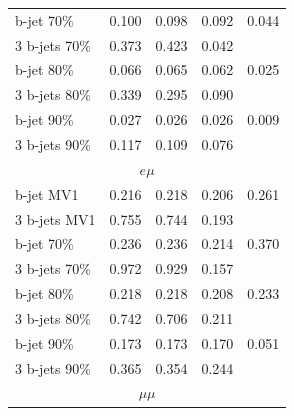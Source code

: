 \begin{table}[h]
\begin{center}
{\begin{tabular}{l|cccc }
            b-jet  70\%   & 0.100 & 0.098 & 0.092 & 0.044 \\        
            3 b-jets 70\% & 0.373 & 0.423 & 0.042 &       \\\hline  
                                                                    
            b-jet 80\%    & 0.066 & 0.065 & 0.062 & 0.025 \\        
            3 b-jets 80\% & 0.339 & 0.295 & 0.090 &       \\\hline  
                                                                    
            b-jet 90\%    & 0.027 & 0.026 & 0.026 & 0.009 \\        
            3 b-jets 90\% & 0.117 & 0.109 & 0.076 &       \\\hline  
                                                                    
            \multicolumn{5}{c}{$e\mu$} \\ \hline 

            b-jet MV1     & 0.216 & 0.218 & 0.206 & 0.261 \\        
            3 b-jets MV1  & 0.755 & 0.744 & 0.193 &       \\\hline  
                                                                    
            b-jet  70\%   & 0.236 & 0.236 & 0.214 &  0.370 \\        
            3 b-jets 70\% & 0.972 & 0.929 & 0.157 &       \\\hline  
                                                                    
            b-jet 80\%    & 0.218 & 0.218 & 0.208 & 0.233 \\        
            3 b-jets 80\% & 0.742 & 0.706 & 0.211 &       \\\hline  
                                                                    
            b-jet 90\%    & 0.173 & 0.173 & 0.170 & 0.051 \\        
            3 b-jets 90\% & 0.365 & 0.354 & 0.244 &       \\\hline  
                                                                    
            \multicolumn{5}{c}{$\mu\mu$} \\ \hline                                                       
                                                                    

\end{tabular}}
\end{center}
\end{table}
